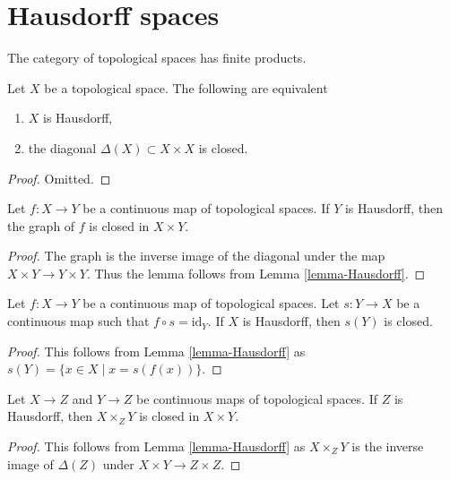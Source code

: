 \section{Hausdorff spaces}
\label{section-Hausdorff}

\noindent
The category of topological spaces has finite products.

\begin{lemma}
\label{lemma-Hausdorff}
Let $X$ be a topological space. The following are equivalent
\begin{enumerate}
\item $X$ is Hausdorff,
\item the diagonal $\Delta(X) \subset X \times X$ is closed.
\end{enumerate}
\end{lemma}

\begin{proof}
Omitted.
\end{proof}

\begin{lemma}
\label{lemma-graph-closed}
Let $f : X \to Y$ be a continuous map of topological spaces.
If $Y$ is Hausdorff, then the graph of $f$ is closed in $X \times Y$.
\end{lemma}

\begin{proof}
The graph is the inverse image of the diagonal under the map
$X \times Y \to Y \times Y$. Thus the lemma follows from
Lemma \ref{lemma-Hausdorff}.
\end{proof}

\begin{lemma}
\label{lemma-section-closed}
Let $f : X \to Y$ be a continuous map of topological spaces.
Let $s : Y \to X$ be a continuous map such that $f \circ s = \text{id}_Y$.
If $X$ is Hausdorff, then $s(Y)$ is closed.
\end{lemma}

\begin{proof}
This follows from Lemma \ref{lemma-Hausdorff} as
$s(Y) = \{x \in X \mid x = s(f(x))\}$.
\end{proof}

\begin{lemma}
\label{lemma-fibre-product-closed}
Let $X \to Z$ and $Y \to Z$ be continuous maps of topological spaces.
If $Z$ is Hausdorff, then  $X \times_Z Y$ is closed in $X \times Y$.
\end{lemma}

\begin{proof}
This follows from Lemma \ref{lemma-Hausdorff} as
$X \times_Z Y$ is the inverse image of $\Delta(Z)$
under $X \times Y \to Z \times Z$.
\end{proof}







